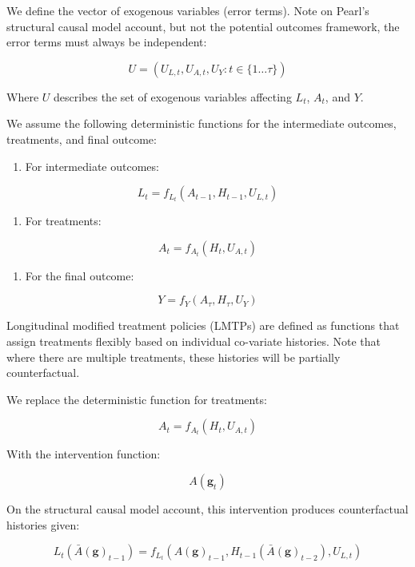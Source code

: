 \documentclass[
  single column]{article}
\providecommand{\tightlist}{%
  \setlength{\itemsep}{0pt}\setlength{\parskip}{0pt}}\usepackage{longtable,booktabs,array}
\begin{document}
We define the vector of exogenous variables (error terms). Note on
Pearl's structural causal model account, but not the potential outcomes
framework, the error terms must always be independent:

\[
U = (U_{L,t}, U_{A,t}, U_{Y}: t \in \{1 \dots \tau\})
\]

Where \(U\) describes the set of exogenous variables affecting \(L_t\),
\(A_t\), and \(Y\).

We assume the following deterministic functions for the intermediate
outcomes, treatments, and final outcome:

\begin{enumerate}
\def\labelenumi{\arabic{enumi}.}
\tightlist
\item
  For intermediate outcomes:
\end{enumerate}

\[
L_t = f_{L_t}(A_{t-1}, H_{t-1}, U_{L,t})
\]

\begin{enumerate}
\def\labelenumi{\arabic{enumi}.}
\setcounter{enumi}{1}
\tightlist
\item
  For treatments:
\end{enumerate}

\[
A_t = f_{A_t}(H_t, U_{A,t})
\]

\begin{enumerate}
\def\labelenumi{\arabic{enumi}.}
\setcounter{enumi}{2}
\tightlist
\item
  For the final outcome:
\end{enumerate}

\[
Y = f_{Y}(A_{\tau}, H_{\tau}, U_{Y})
\]

Longitudinal modified treatment policies (LMTPs) are defined as
functions that assign treatments flexibly based on individual co-variate
histories. Note that where there are multiple treatments, these
histories will be partially counterfactual.

We replace the deterministic function for treatments:

\[
A_t = f_{A_t}(H_t, U_{A,t})
\]

With the intervention function:

\[
A(\mathbf{g}_t)
\]

On the structural causal model account, this intervention produces
counterfactual histories given:

\[
L_t(\bar{A}(\mathbf{g})_{t-1}) = f_{L_t}(A(\mathbf{g})_{t-1}, H_{t-1}(\bar{A}(\mathbf{g})_{t-2}), U_{L,t})
\]
\end{document}

